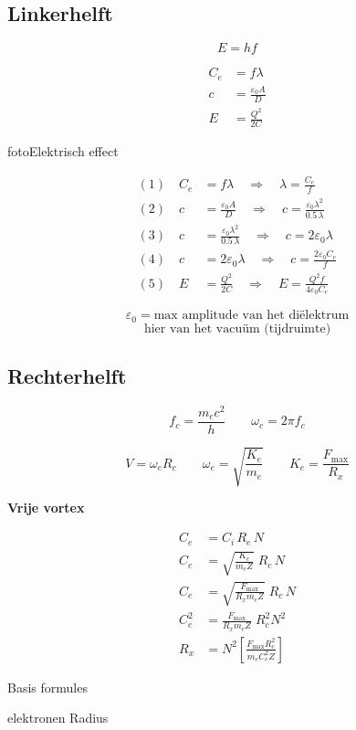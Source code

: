 \documentclass[11pt,a4paper]{article}
\begin{document}
\begin{minipage}[t]{0.48\textwidth}
\subsection*{Linkerhelft}

\[
E = h f
\]

\begin{align*}
C_e &= f\lambda
\\
c &= \frac{\varepsilon_0 A}{D}
\\
E &= \frac{Q^2}{2C}
\end{align*}

fotoElektrisch effect

\begin{align*}
(1)\quad C_e &= f\lambda
\quad \Rightarrow \quad
\lambda = \frac{C_e}{f}
\\[0.3em]
(2)\quad c &= \frac{\varepsilon_0 A}{D}
\quad \Rightarrow \quad
c = \frac{\varepsilon_0 \lambda^2}{0.5\,\lambda}
\\[0.3em]
(3)\quad c &= \frac{\varepsilon_0 \lambda^2}{0.5\,\lambda}
\quad \Rightarrow \quad
c = 2\varepsilon_0\lambda
\\[0.3em]
(4)\quad c &= 2\varepsilon_0\lambda
\quad \Rightarrow \quad
c = \frac{2\varepsilon_0 C_e}{f}
\\[0.3em]
(5)\quad E &= \frac{Q^2}{2C}
\quad \Rightarrow \quad
E = \frac{Q^2 f}{4\varepsilon_0 C_e}
\end{align*}

\[
\varepsilon_0
=
\text{max amplitude van het di\"elektrum}
\]
\[
\text{hier van het vacu\"um (tijdruimte)}
\]
\end{minipage}
\hfill
\begin{minipage}[t]{0.48\textwidth}
\subsection*{Rechterhelft}

\[
f_c = \frac{m_e c^2}{h}
\qquad
\omega_c = 2\pi f_c
\]

\[
V = \omega_e R_c
\qquad
\omega_e = \sqrt{\frac{K_e}{m_e}}
\qquad
K_e = \frac{F_{\max}}{R_x}
\]

\textbf{Vrije vortex}

\begin{align*}
C_e &= C_i\,R_e\,N
\\
C_e &= \sqrt{\frac{K_e}{m_e Z}}\;R_c\,N
\\
C_e &= \sqrt{\frac{F_{\max}}{R_x m_e Z}}\;R_c\,N
\\
C_e^2 &= \frac{F_{\max}}{R_x m_e Z}\;R_c^2 N^2
\\[0.4em]
R_x &= N^2
\left[
\frac{F_{\max} R_c^2}{m_e C_e^2 Z}
\right]
\end{align*}

Basis formules

\medskip

elektronen Radius
\end{minipage}
\end{document}
